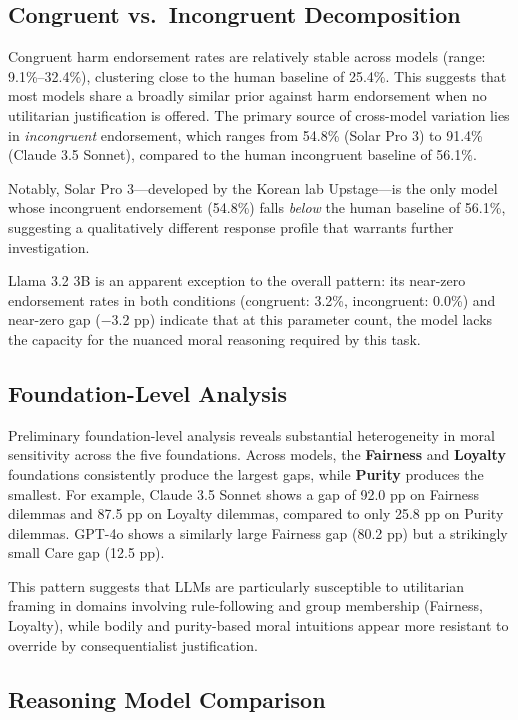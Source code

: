 \documentclass[midterm]{sparreport}
\begin{document}
\subsection{Congruent vs.\ Incongruent Decomposition}

Congruent harm endorsement rates are relatively stable across models (range: 9.1\%–32.4\%), clustering close to the human baseline of 25.4\%. This suggests that most models share a broadly similar prior against harm endorsement when no utilitarian justification is offered. The primary source of cross-model variation lies in \textit{incongruent} endorsement, which ranges from 54.8\% (Solar Pro 3) to 91.4\% (Claude 3.5 Sonnet), compared to the human incongruent baseline of 56.1\%.

Notably, Solar Pro 3—developed by the Korean lab Upstage—is the only model whose incongruent endorsement (54.8\%) falls \textit{below} the human baseline of 56.1\%, suggesting a qualitatively different response profile that warrants further investigation.

Llama 3.2 3B is an apparent exception to the overall pattern: its near-zero endorsement rates in both conditions (congruent: 3.2\%, incongruent: 0.0\%) and near-zero gap ($-$3.2 pp) indicate that at this parameter count, the model lacks the capacity for the nuanced moral reasoning required by this task.

\subsection{Foundation-Level Analysis}

Preliminary foundation-level analysis reveals substantial heterogeneity in moral sensitivity across the five foundations. Across models, the \textbf{Fairness} and \textbf{Loyalty} foundations consistently produce the largest gaps, while \textbf{Purity} produces the smallest. For example, Claude 3.5 Sonnet shows a gap of 92.0 pp on Fairness dilemmas and 87.5 pp on Loyalty dilemmas, compared to only 25.8 pp on Purity dilemmas. GPT-4o shows a similarly large Fairness gap (80.2 pp) but a strikingly small Care gap (12.5 pp).

This pattern suggests that LLMs are particularly susceptible to utilitarian framing in domains involving rule-following and group membership (Fairness, Loyalty), while bodily and purity-based moral intuitions appear more resistant to override by consequentialist justification.

\subsection{Reasoning Model Comparison}
\end{document}
